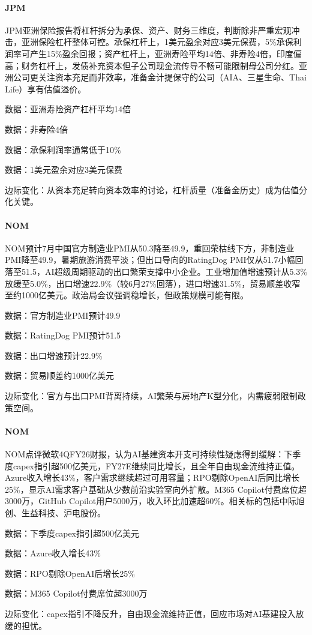 \documentclass[11pt]{ctexart}
\begin{document}
\paragraph{JPM} JPM亚洲保险报告将杠杆拆分为承保、资产、财务三维度，判断除非严重宏观冲击，亚洲保险杠杆整体可控。承保杠杆上，1美元盈余对应3美元保费，5\%承保利润率可产生15\%盈余回报；资产杠杆上，亚洲寿险平均14倍、非寿险4倍，印度偏高；财务杠杆上，发债补充资本但子公司现金流传导不畅可能限制母公司分红。亚洲公司更关注资本充足而非效率，准备金计提保守的公司（AIA、三星生命、Thai Life）享有估值溢价。
{\small\color{refgray}数据：亚洲寿险资产杠杆平均14倍\par}
{\small\color{refgray}数据：非寿险4倍\par}
{\small\color{refgray}数据：承保利润率通常低于10\%\par}
{\small\color{refgray}数据：1美元盈余对应3美元保费\par}
{\small\color{refgray}边际变化：从资本充足转向资本效率的讨论，杠杆质量（准备金历史）成为估值分化关键。\par}
\paragraph{NOM} NOM预计7月中国官方制造业PMI从50.3降至49.9，重回荣枯线下方，非制造业PMI降至49.9，暑期旅游消费平淡；但出口导向的RatingDog PMI仅从51.7小幅回落至51.5，AI超级周期驱动的出口繁荣支撑中小企业。工业增加值增速预计从5.3\%放缓至5.0\%，出口增速22.9\%（较6月27\%回落），进口增速31.5\%，贸易顺差收窄至约1000亿美元。政治局会议强调稳增长，但政策规模可能有限。
{\small\color{refgray}数据：官方制造业PMI预计49.9\par}
{\small\color{refgray}数据：RatingDog PMI预计51.5\par}
{\small\color{refgray}数据：出口增速预计22.9\%\par}
{\small\color{refgray}数据：贸易顺差约1000亿美元\par}
{\small\color{refgray}边际变化：官方与出口PMI背离持续，AI繁荣与房地产K型分化，内需疲弱限制政策空间。\par}
\paragraph{NOM} NOM点评微软4QFY26财报，认为AI基建资本开支可持续性疑虑得到缓解：下季度capex指引超500亿美元，FY27E继续同比增长，且全年自由现金流维持正值。Azure收入增长43\%，客户需求继续超过可用容量；RPO剔除OpenAI后同比增长25\%，显示AI需求客户基础从少数前沿实验室向外扩散。M365 Copilot付费席位超3000万，GitHub Copilot用户5000万，收入环比加速超60\%。相关标的包括中际旭创、生益科技、沪电股份。
{\small\color{refgray}数据：下季度capex指引超500亿美元\par}
{\small\color{refgray}数据：Azure收入增长43\%\par}
{\small\color{refgray}数据：RPO剔除OpenAI后增长25\%\par}
{\small\color{refgray}数据：M365 Copilot付费席位超3000万\par}
{\small\color{refgray}边际变化：capex指引不降反升，自由现金流维持正值，回应市场对AI基建投入放缓的担忧。\par}
\end{document}
